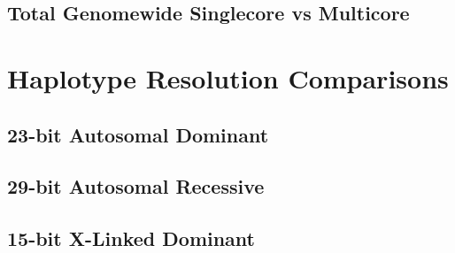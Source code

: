 \subsection{Total Genomewide Singlecore vs Multicore}

\section{Haplotype Resolution Comparisons}
\subsection{23-bit Autosomal Dominant}
\subsection{29-bit Autosomal Recessive}
\subsection{15-bit X-Linked Dominant}



